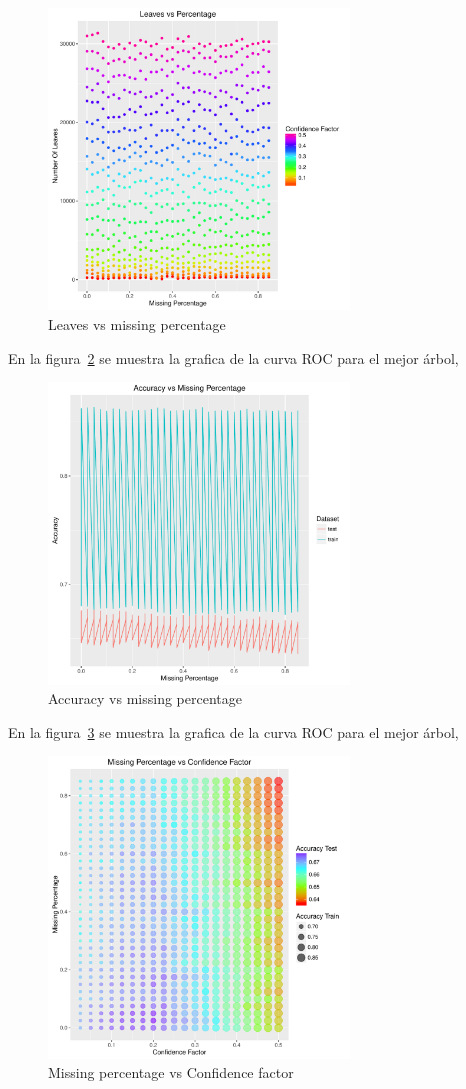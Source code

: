 \begin{figure}
  \centering
  \includegraphics[width = 8cm]{4b.pdf}
  \caption{Leaves vs missing percentage}
  \label{fig:4b}
\end{figure}

En la figura~\ref{fig:4c} se muestra la grafica de la curva ROC para el mejor árbol,

\begin{figure}
  \centering
  \includegraphics[width = 8cm]{4c.pdf}
  \caption{Accuracy vs missing percentage}
  \label{fig:4c}
\end{figure}

En la figura~\ref{fig:4d} se muestra la grafica de la curva ROC para el mejor árbol,

\begin{figure}
  \centering
  \includegraphics[width = 8cm]{4d.pdf}
  \caption{Missing percentage vs Confidence factor}
  \label{fig:4d}
\end{figure}

